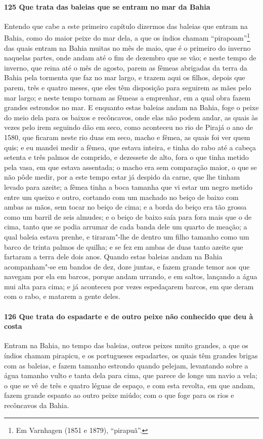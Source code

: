 \begin{linenumbers}
\paragraph{125 Que trata das baleias que se entram no mar da Bahia}\quad
Entendo que cabe a este primeiro capítulo dizermos das baleias que entram na Bahia, como
do maior peixe do mar dela, a que os índios chamam ``pirapoam''\footnote{ Em Varnhagen
(1851 e 1879), ``pirapuã''.} das quais entram na Bahia muitas no mês de maio, que é o
primeiro do inverno naquelas partes, onde andam até o fim de dezembro que se vão; e neste
tempo de inverno, que reina até o mês de agosto, parem as fêmeas abrigadas da terra da
Bahia pela tormenta que faz no mar largo, e trazem aqui os filhos, depois que parem, três
e quatro meses, que eles têm disposição para seguirem as mães pelo mar largo; e neste
tempo tornam as fêmeas a emprenhar, em a qual obra fazem grandes estrondos no mar. E
enquanto estas baleias andam na Bahia, foge o peixe do meio dela para os baixos e
recôncavos, onde elas não podem andar, as quais às vezes pelo irem seguindo dão em seco,
como aconteceu no rio de Pirajá o ano de 1580, que ficaram neste rio duas em seco, macho e
fêmea, as quais foi ver quem quis; e eu mandei medir a fêmea, que estava inteira, e tinha
do rabo até a cabeça setenta e três palmos de comprido, e dezessete de alto, fora o que
tinha metido pela vasa, em que estava assentada; o macho era sem comparação maior, o que
se não pôde medir, por a este tempo estar já despido da carne, que lhe tinham levado para
azeite; a fêmea tinha a boca tamanha que vi estar um negro metido entre um queixo e outro,
cortando com um machado no beiço de baixo com ambas as mãos, sem tocar no beiço de cima; e
a borda do beiço era tão grossa como um barril de seis almudes; e o beiço de baixo saía
para fora mais que o de cima, tanto que se podia arrumar de cada banda dele um quarto de
meação; a qual baleia estava prenhe, e tiraram"-lhe de dentro um filho tamanho como um
barco de trinta palmos de quilha; e se fez em ambas de duas tanto azeite que fartaram a
terra dele dois anos. Quando estas baleias andam na Bahia acompanham"-se em bandos de dez,
doze juntas, e fazem grande temor aos que navegam por ela em barcos, porque andam urrando,
e em saltos, lançando a água mui alta para cima; e já aconteceu por vezes espedaçarem
barcos, em que deram com o rabo, e matarem a gente deles.

\paragraph{126 Que trata do espadarte e de outro peixe não conhecido que deu à costa}\quad
Entram na Bahia, no tempo das baleias, outros peixes muito grandes, a que os índios chamam
pirapicu, e os portugueses espadartes, os quais têm grandes brigas com as baleias, e fazem
tamanho estrondo quando pelejam, levantando sobre a água tamanho vulto e tanta dela para
cima, que parece de longe um navio a vela; o que se vê de três e quatro léguas de espaço,
e com esta revolta, em que andam, fazem grande espanto ao outro peixe miúdo; com o que
foge para os rios e recôncavos da Bahia.


\end{linenumbers}
